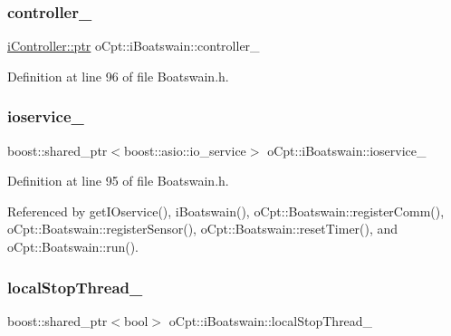 \subsubsection{\texorpdfstring{controller\+\_\+}{controller\_}}
{\footnotesize\ttfamily \hyperlink{classo_cpt_1_1i_controller_a6d89a95cd6ad68bb74adfaca2f36370f}{i\+Controller\+::ptr} o\+Cpt\+::i\+Boatswain\+::controller\+\_\+\hspace{0.3cm}{\ttfamily [protected]}}



Definition at line 96 of file Boatswain.\+h.

\hypertarget{classo_cpt_1_1i_boatswain_a95b337b39962f9c63fd82b500351a960}{}\label{classo_cpt_1_1i_boatswain_a95b337b39962f9c63fd82b500351a960} 
\subsubsection{\texorpdfstring{ioservice\+\_\+}{ioservice\_}}
{\footnotesize\ttfamily boost\+::shared\+\_\+ptr$<$boost\+::asio\+::io\+\_\+service$>$ o\+Cpt\+::i\+Boatswain\+::ioservice\+\_\+\hspace{0.3cm}{\ttfamily [protected]}}



Definition at line 95 of file Boatswain.\+h.



Referenced by get\+I\+Oservice(), i\+Boatswain(), o\+Cpt\+::\+Boatswain\+::register\+Comm(), o\+Cpt\+::\+Boatswain\+::register\+Sensor(), o\+Cpt\+::\+Boatswain\+::reset\+Timer(), and o\+Cpt\+::\+Boatswain\+::run().

\hypertarget{classo_cpt_1_1i_boatswain_a38228671875f0c0ed945d2f44422d649}{}\label{classo_cpt_1_1i_boatswain_a38228671875f0c0ed945d2f44422d649} 
\subsubsection{\texorpdfstring{local\+Stop\+Thread\+\_\+}{localStopThread\_}}
{\footnotesize\ttfamily boost\+::shared\+\_\+ptr$<$bool$>$ o\+Cpt\+::i\+Boatswain\+::local\+Stop\+Thread\+\_\+\hspace{0.3cm}{\ttfamily [protected]}}



